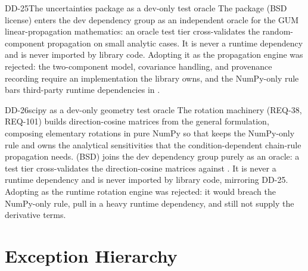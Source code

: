 \begin{ddbox}{DD-25}{The uncertainties package as a dev-only test oracle}
The  package (BSD license) enters the dev dependency
group as an independent oracle for the GUM linear-propagation
mathematics: an oracle test tier cross-validates the random-component
propagation on small analytic cases. It is never a runtime dependency
and is never imported by library code. Adopting it as the propagation
engine was rejected: the two-component model, covariance handling, and
provenance recording require an implementation the library owns, and
the NumPy-only rule bars third-party runtime dependencies in
.
\end{ddbox}

\begin{ddbox}{DD-26}{scipy as a dev-only geometry test oracle}
The rotation machinery (REQ-38, REQ-101) builds direction-cosine
matrices from the general formulation, composing elementary rotations
in pure NumPy so that  keeps the NumPy-only rule and
\itc{} owns the analytical sensitivities  that the
condition-dependent chain-rule propagation needs.  (BSD)
joins the dev dependency group purely as an oracle: a test tier
cross-validates the direction-cosine matrices against
. It is never a runtime
dependency and is never imported by library code, mirroring DD-25.
Adopting  as the runtime rotation engine was rejected: it
would breach the NumPy-only rule, pull in a heavy runtime dependency,
and still not supply the derivative terms.
\end{ddbox}

\section{Exception Hierarchy}

